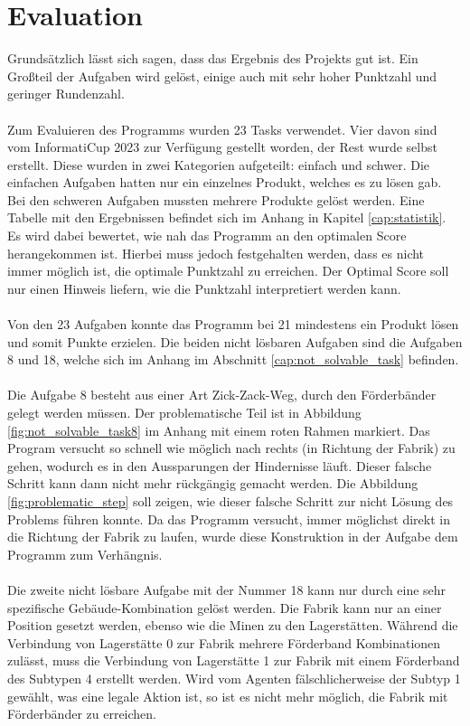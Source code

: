 \section{Evaluation}\label{cap:evaluation}
Grundsätzlich lässt sich sagen, dass das Ergebnis des Projekts gut ist. Ein Großteil der Aufgaben wird gelöst, einige auch mit sehr hoher Punktzahl und geringer Rundenzahl.
\\\\
Zum Evaluieren des Programms wurden 23 Tasks verwendet. Vier davon sind vom InformatiCup 2023 zur Verfügung gestellt worden, der Rest wurde selbst erstellt. Diese wurden in zwei Kategorien aufgeteilt: einfach und schwer. Die einfachen Aufgaben hatten nur ein einzelnes Produkt, welches es zu lösen gab. Bei den schweren Aufgaben mussten mehrere Produkte gelöst werden. Eine Tabelle mit den Ergebnissen befindet sich im Anhang in Kapitel \ref{cap:statistik}. Es wird dabei bewertet, wie nah das Programm an den optimalen Score herangekommen ist. Hierbei muss jedoch festgehalten werden, dass es nicht immer möglich ist, die optimale Punktzahl zu erreichen. Der Optimal Score soll nur einen Hinweis liefern, wie die Punktzahl interpretiert werden kann. 
\\\\
Von den 23 Aufgaben konnte das Programm bei 21 mindestens ein Produkt lösen und somit Punkte erzielen. Die beiden nicht lösbaren Aufgaben sind die Aufgaben 8 und 18, welche sich im Anhang im Abschnitt \ref{cap:not_solvable_task} befinden.
\\\\
Die Aufgabe 8 besteht aus einer Art Zick-Zack-Weg, durch den Förderbänder gelegt werden müssen. Der problematische Teil ist in Abbildung \ref{fig:not_solvable_task8} im Anhang mit einem roten Rahmen markiert. Das Program versucht so schnell wie möglich nach rechts (in Richtung der Fabrik) zu gehen, wodurch es in den Aussparungen der Hindernisse läuft. Dieser falsche Schritt kann dann nicht mehr rückgängig gemacht werden. Die Abbildung \ref{fig:problematic_step} soll zeigen, wie dieser falsche Schritt zur nicht Lösung des Problems führen konnte.
Da das Programm versucht, immer möglichst direkt in die Richtung der Fabrik zu laufen, wurde diese Konstruktion in der Aufgabe dem Programm zum Verhängnis.
\\\\
Die zweite nicht lösbare Aufgabe mit der Nummer 18 kann nur durch eine sehr spezifische Gebäude-Kombination gelöst werden. Die Fabrik kann nur an einer Position gesetzt werden, ebenso wie die Minen zu den Lagerstätten. Während die Verbindung von Lagerstätte 0 zur Fabrik mehrere Förderband Kombinationen zulässt, muss die Verbindung von Lagerstätte 1 zur Fabrik mit einem Förderband des Subtypen 4 erstellt werden. Wird vom Agenten fälschlicherweise der Subtyp 1 gewählt, was eine legale Aktion ist, so ist es nicht mehr möglich, die Fabrik mit Förderbänder zu erreichen. \\
